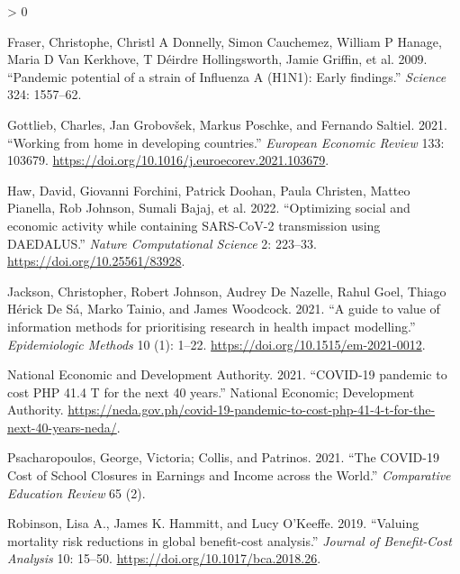 \documentclass[
]{article}
\newlength{\cslhangindent}
\newenvironment{CSLReferences}[2] %
 {%
  \setlength{\parindent}{0pt}
  \ifodd #1 \everypar{\setlength{\hangindent}{\cslhangindent}}\ignorespaces\fi
  \ifnum #2 > 0
  \setlength{\parskip}{#2\baselineskip}
  \fi
 }%
 {}
\begin{document}
\hypertarget{refs}{}
\begin{CSLReferences}{1}{0}
\leavevmode\hypertarget{ref-Fraser2009}{}%
Fraser, Christophe, Christl A Donnelly, Simon Cauchemez, William P Hanage, Maria D Van Kerkhove, T Déirdre Hollingsworth, Jamie Griffin, et al. 2009. {``{Pandemic potential of a strain of Influenza A (H1N1): Early findings}.''} \emph{Science} 324: 1557--62.

\leavevmode\hypertarget{ref-Gottlieb2021}{}%
Gottlieb, Charles, Jan Grobovšek, Markus Poschke, and Fernando Saltiel. 2021. {``{Working from home in developing countries}.''} \emph{European Economic Review} 133: 103679. \url{https://doi.org/10.1016/j.euroecorev.2021.103679}.

\leavevmode\hypertarget{ref-Haw2020}{}%
Haw, David, Giovanni Forchini, Patrick Doohan, Paula Christen, Matteo Pianella, Rob Johnson, Sumali Bajaj, et al. 2022. {``{Optimizing social and economic activity while containing SARS-CoV-2 transmission using DAEDALUS}.''} \emph{Nature Computational Science} 2: 223--33. \url{https://doi.org/10.25561/83928}.

\leavevmode\hypertarget{ref-Jackson2021}{}%
Jackson, Christopher, Robert Johnson, Audrey De Nazelle, Rahul Goel, Thiago Hérick De Sá, Marko Tainio, and James Woodcock. 2021. {``{A guide to value of information methods for prioritising research in health impact modelling}.''} \emph{Epidemiologic Methods} 10 (1): 1--22. \url{https://doi.org/10.1515/em-2021-0012}.

\leavevmode\hypertarget{ref-NationalEconomicandDevelopmentAuthority2021}{}%
National Economic and Development Authority. 2021. {``{COVID-19 pandemic to cost PHP 41.4 T for the next 40 years}.''} National Economic; Development Authority. \url{https://neda.gov.ph/covid-19-pandemic-to-cost-php-41-4-t-for-the-next-40-years-neda/}.

\leavevmode\hypertarget{ref-Psacharopoulos2021a}{}%
Psacharopoulos, George, Victoria; Collis, and Patrinos. 2021. {``{The COVID-19 Cost of School Closures in Earnings and Income across the World}.''} \emph{Comparative Education Review} 65 (2).

\leavevmode\hypertarget{ref-Robinson2019}{}%
Robinson, Lisa A., James K. Hammitt, and Lucy O'Keeffe. 2019. {``{Valuing mortality risk reductions in global benefit-cost analysis}.''} \emph{Journal of Benefit-Cost Analysis} 10: 15--50. \url{https://doi.org/10.1017/bca.2018.26}.

\end{CSLReferences}
\end{document}
